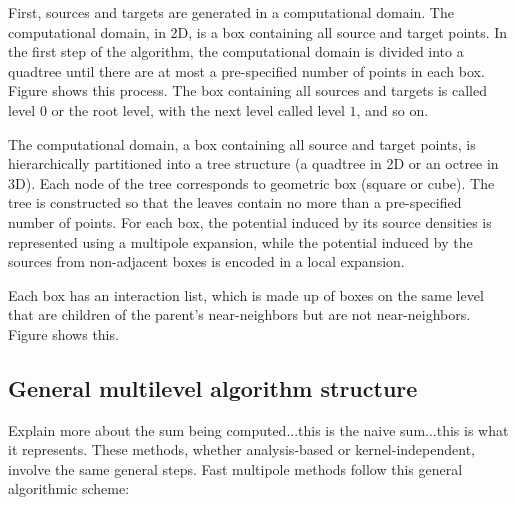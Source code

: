 \documentclass[11pt, oneside]{article}   	%
\begin{document}
First, sources and targets are generated in a computational domain. The computational domain, in 2D, is a box containing all source and target points. In the first step of the algorithm, the computational domain is divided into a quadtree until there are at most a pre-specified number of points in each box. Figure shows this process. The box containing all sources and targets is called level $0$ or the root level, with the next level called level $1$, and so on.

The computational domain, a box containing all source and target points, is hierarchically partitioned into a tree structure (a quadtree in 2D or an octree in 3D). Each node of the tree corresponds to geometric box (square or cube). The tree is constructed so that the leaves contain no more than a pre-specified number of points. For each box, the potential induced by its source densities is represented using a multipole expansion, while the potential induced by the sources from non-adjacent boxes is encoded in a local expansion.

Each box has an interaction list, which is made up of boxes on the same level that are children of the parent's near-neighbors but are not near-neighbors. Figure shows this.

\subsection{General multilevel algorithm structure}
Explain more about the sum being computed...this is the naive sum...this is what it represents.
These methods, whether analysis-based or kernel-independent, involve the same general steps. Fast multipole methods follow this general algorithmic scheme:
\end{document}
